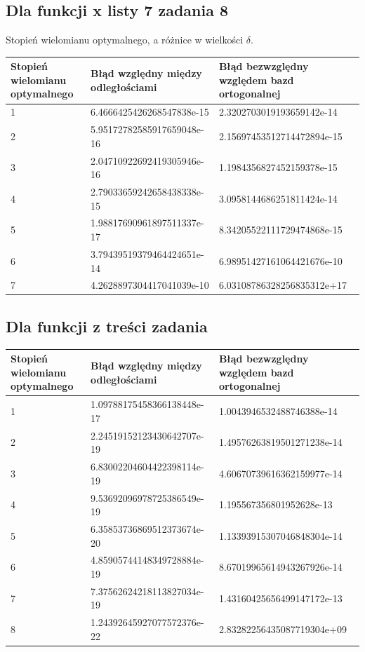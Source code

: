\documentclass{article}
\begin{document}
\subsection{Dla funkcji x listy 7 zadania 8}
Stopień wielomianu optymalnego, a różnice w wielkości $\delta$.
\begin{center}
    \begin{tabular}{ |p{2cm}|p{}|p{}|}
     \hline
     Stopień wielomianu optymalnego &  Błąd względny między odległościami & Błąd bezwzględny względem bazd ortogonalnej\\
      \hline
      1 & 6.4666425426268547838e-15 & 2.3202703019193659142e-14\\
      \hline
      2 & 5.95172782585917659048e-16 & 2.15697453512714472894e-15\\
      \hline
      3 & 2.04710922692419305946e-16 & 1.1984356827452159378e-15\\
      \hline
      4 & 2.79033659242658438338e-15 & 3.0958144686251811424e-14\\
      \hline
      5 & 1.98817690961897511337e-17 & 8.34205522111729474868e-15\\
      \hline
      6 & 3.79439519379464424651e-14 & 6.98951427161064421676e-10\\
      \hline
      7 & 4.2628897304417041039e-10 & 6.03108786328256835312e+17\\
      \hline
\end{tabular}
\end{center}
\subsection{Dla funkcji z treści zadania}
\begin{center}
    \begin{tabular}{ |p{2cm}|p{}|p{}|}
     \hline
     Stopień wielomianu optymalnego &  Błąd względny między odległościami & Błąd bezwzględny względem bazd ortogonalnej\\
      	\hline
	1 & 1.09788175458366138448e-17 & 1.0043946532488746388e-14\\
	\hline
	2 & 2.24519152123430642707e-19 & 1.49576263819501271238e-14\\
	\hline
	3 & 6.83002204604422398114e-19 & 4.60670739616362159977e-14\\
	\hline
	4 & 9.53692096978725386549e-19 & 1.195567356801952628e-13\\
	\hline
	5 & 6.35853736869512373674e-20 & 1.13393915307046848304e-14\\
	\hline
	6 & 4.85905744148349728884e-19 & 8.67019965614943267926e-14\\
	\hline
	7 & 7.37562624218113827034e-19 & 1.43160425656499147172e-13\\
	\hline
	8 & 1.24392645927077572376e-22 & 2.83282256435087719304e+09\\
	\hline
\end{tabular}
\end{center}
\newpage
\end{document}
